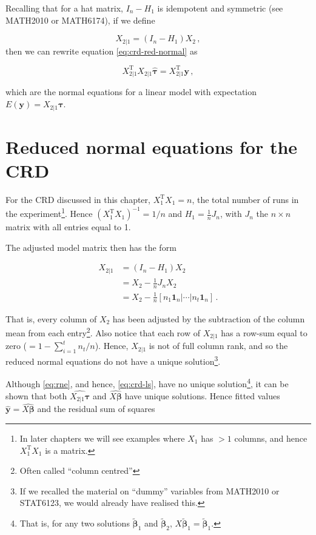 \documentclass[
]{book}
\theoremstyle{definition}
\theoremstyle{definition}
\theoremstyle{definition}
\theoremstyle{definition}
\theoremstyle{remark}
\begin{document}
Recalling that for a hat matrix, \(I_n - H_1\) is idempotent and symmetric (see MATH2010 or MATH6174), if we define

\[
X_{2|1} = (I_n - H_1)X_2\,,
\]
then we can rewrite equation \eqref{eq:crd-red-normal} as

\begin{equation}
X_{2|1}^{\mathrm{T}}X_{2|1}\hat{\boldsymbol{\tau}} = X_{2|1}^{\mathrm{T}}\boldsymbol{y}\,, 
\label{eq:rne}
\end{equation}

which are the normal equations for a linear model with expectation \(E(\boldsymbol{y}) = X_{2|1}\boldsymbol{\tau}\).

\hypertarget{reduced-normal-equations-for-the-crd}{%
\section{Reduced normal equations for the CRD}\label{reduced-normal-equations-for-the-crd}}

For the CRD discussed in this chapter, \(X_1^{\mathrm{T}}X_1 = n\), the total number of runs in the experiment\footnote{In later chapters we will see examples where \(X_1\) has \(>1\) columns, and hence \(X_1^{\mathrm{T}}X_1\) is a matrix.}. Hence \((X_1^{\mathrm{T}}X_1)^{-1} = 1/n\) and \(H_1 = \frac{1}{n}J_n\), with \(J_n\) the \(n\times n\) matrix with all entries equal to 1.

The adjusted model matrix then has the form

\begin{align}
X_{2|1} & = (I_n - H_1)X_2 \nonumber\\
& = X_2 - \frac{1}{n}J_nX_2 \nonumber\\
& = X_2 - \frac{1}{n}[n_1\boldsymbol{1}_n \vert \cdots \vert n_t\boldsymbol{1}_n]\,. \label{eq:crd-x21} 
\end{align}

That is, every column of \(X_2\) has been adjusted by the subtraction of the column mean from each entry\footnote{Often called ``column centred''}. Also notice that each row of \(X_{2|1}\) has a row-sum equal to zero (\(= 1 - \sum_{i=1}^tn_t/n\)). Hence, \(X_{2|1}\) is not of full column rank, and so the reduced normal equations do not have a unique solution\footnote{If we recalled the material on ``dummy'' variables from MATH2010 or STAT6123, we would already have realised this.}.

Although \eqref{eq:rne}, and hence, \eqref{eq:crd-ls}, have no unique solution\footnote{That is, for any two solutions \(\tilde{\boldsymbol{\beta}}_1\) and \(\tilde{\boldsymbol{\beta}}_2\), \(X\tilde{\boldsymbol{\beta}}_1 = \tilde{\boldsymbol{\beta}}_1\).}, it can be shown that both \(\widehat{X_{2|1}\boldsymbol{\tau}}\) and \(\widehat{X\boldsymbol{\beta}}\) have unique solutions. Hence fitted values \(\hat{\boldsymbol{y}} = \widehat{X\boldsymbol{\beta}}\) and the residual sum of squares
\end{document}
